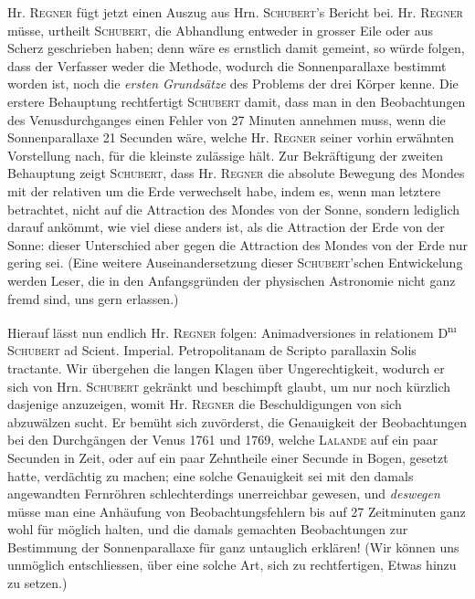 Hr. \textsc{Regner} fügt jetzt einen Auszug aus Hrn. \textsc{Schubert}'s Bericht bei. Hr. \textsc{Regner} müsse, urtheilt \textsc{Schubert}, die Abhandlung entweder in grosser Eile oder aus Scherz geschrieben haben; denn wäre es ernstlich damit gemeint, so würde folgen, dass der Verfasser weder die Methode, wodurch die Sonnenparallaxe bestimmt worden ist, noch die \emph{ersten Grundsätze} des Problems der drei Körper kenne. Die erstere Behauptung rechtfertigt \textsc{Schubert} damit, dass man in den Beobachtungen des Venusdurchganges einen Fehler von 27 Minuten annehmen muss, wenn die Sonnenparallaxe 21 Secunden wäre, welche Hr. \textsc{Regner} seiner vorhin erwähnten Vorstellung nach, für die kleinste zulässige hält. Zur Bekräftigung der zweiten Behauptung zeigt \textsc{Schubert}, dass Hr. \textsc{Regner} die absolute Bewegung des Mondes mit der relativen um die Erde verwechselt habe, indem es, wenn man letztere betrachtet, nicht auf die Attraction des Mondes von der Sonne, sondern lediglich darauf ankömmt, wie viel diese anders ist, als die Attraction der Erde von der Sonne: dieser Unterschied aber gegen die Attraction des Mondes von der Erde nur gering sei. (Eine weitere Auseinandersetzung dieser \textsc{Schubert}'schen Entwickelung werden Leser, die in den Anfangsgründen der physischen Astronomie nicht ganz fremd sind, uns gern erlassen.)

Hierauf lässt nun endlich Hr. \textsc{Regner} folgen: Animadversiones in relationem D\textsuperscript{nı} \textsc{Schubert} ad Scient. Imperial. Petropolitanam de Scripto parallaxin Solis tractante. Wir übergehen die langen Klagen über Ungerechtigkeit, wodurch er sich von Hrn. \textsc{Schubert} gekränkt und beschimpft glaubt, um nur noch kürzlich dasjenige anzuzeigen, womit Hr. \textsc{Regner} die Beschuldigungen von sich abzuwälzen sucht. Er bemüht sich zuvörderst, die Genauigkeit der Beobachtungen bei den Durchgängen der Venus 1761 und 1769, welche \textsc{Lalande} auf ein paar Secunden in Zeit, oder auf ein paar Zehntheile einer Secunde in Bogen, gesetzt hatte, verdächtig zu machen; eine solche Genauigkeit sei mit den damals angewandten Fernröhren schlechterdings unerreichbar gewesen, und \emph{deswegen} müsse man eine Anhäufung von Beobachtungsfehlern bis auf 27 Zeitminuten ganz wohl für möglich halten, und die damals gemachten Beobachtungen zur Bestimmung der Sonnenparallaxe für ganz untauglich erklären! (Wir können uns unmöglich entschliessen, über eine solche Art, sich zu rechtfertigen, Etwas hinzu zu setzen.)

